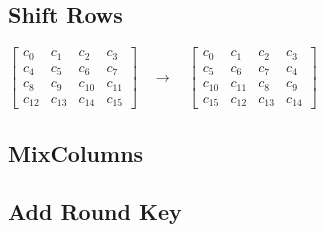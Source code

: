 \subsection{Shift Rows}

\noindent
\flushleft
\(
\begin{bmatrix}
c_0  & c_1  & c_2  & c_3  \\
c_4  & c_5  & c_6  & c_7  \\
c_8  & c_9  & c_{10} & c_{11} \\
c_{12} & c_{13} & c_{14} & c_{15}
\end{bmatrix}
\quad \rightarrow \quad
\begin{bmatrix}
c_0  & c_1  & c_2  & c_3  \\
c_5  & c_6  & c_7  & c_4  \\
c_{10} & c_{11} & c_8  & c_9  \\
c_{15} & c_{12} & c_{13} & c_{14}
\end{bmatrix}
\)
\flushleft
\subsection{MixColumns}
\subsection{Add Round Key}
